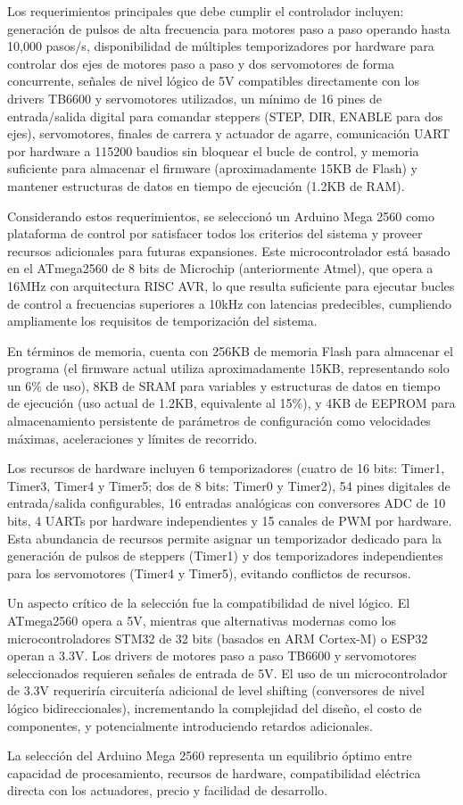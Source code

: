 Los requerimientos principales que debe cumplir el controlador incluyen: generación de pulsos de alta frecuencia para motores paso a paso operando hasta 10,000 pasos/s, disponibilidad de múltiples temporizadores por hardware para controlar dos ejes de motores paso a paso y dos servomotores de forma concurrente, señales de nivel lógico de 5V compatibles directamente con los drivers TB6600 y servomotores utilizados, un mínimo de 16 pines de entrada/salida digital para comandar steppers (STEP, DIR, ENABLE para dos ejes), servomotores, finales de carrera y actuador de agarre, comunicación UART por hardware a 115200 baudios sin bloquear el bucle de control, y memoria suficiente para almacenar el firmware (aproximadamente 15KB de Flash) y mantener estructuras de datos en tiempo de ejecución (1.2KB de RAM).

Considerando estos requerimientos, se seleccionó un Arduino Mega 2560 como plataforma de control por satisfacer todos los criterios del sistema y proveer recursos adicionales para futuras expansiones. Este microcontrolador está basado en el ATmega2560 de 8 bits de Microchip (anteriormente Atmel), que opera a 16MHz con arquitectura RISC AVR, lo que resulta suficiente para ejecutar bucles de control a frecuencias superiores a 10kHz con latencias predecibles, cumpliendo ampliamente los requisitos de temporización del sistema.

En términos de memoria, cuenta con 256KB de memoria Flash para almacenar el programa (el firmware actual utiliza aproximadamente 15KB, representando solo un 6\% de uso), 8KB de SRAM para variables y estructuras de datos en tiempo de ejecución (uso actual de 1.2KB, equivalente al 15\%), y 4KB de EEPROM para almacenamiento persistente de parámetros de configuración como velocidades máximas, aceleraciones y límites de recorrido.

Los recursos de hardware incluyen 6 temporizadores (cuatro de 16 bits: Timer1, Timer3, Timer4 y Timer5; dos de 8 bits: Timer0 y Timer2), 54 pines digitales de entrada/salida configurables, 16 entradas analógicas con conversores ADC de 10 bits, 4 UARTs por hardware independientes y 15 canales de PWM por hardware. Esta abundancia de recursos permite asignar un temporizador dedicado para la generación de pulsos de steppers (Timer1) y dos temporizadores independientes para los servomotores (Timer4 y Timer5), evitando conflictos de recursos.

Un aspecto crítico de la selección fue la compatibilidad de nivel lógico. El ATmega2560 opera a 5V, mientras que alternativas modernas como los microcontroladores STM32 de 32 bits (basados en ARM Cortex-M) o ESP32 operan a 3.3V. Los drivers de motores paso a paso TB6600 y servomotores seleccionados requieren señales de entrada de 5V. El uso de un microcontrolador de 3.3V requeriría circuitería adicional de level shifting (conversores de nivel lógico bidireccionales), incrementando la complejidad del diseño, el costo de componentes, y potencialmente introduciendo retardos adicionales.

La selección del Arduino Mega 2560 representa un equilibrio óptimo entre capacidad de procesamiento, recursos de hardware, compatibilidad eléctrica directa con los actuadores, precio y facilidad de desarrollo.